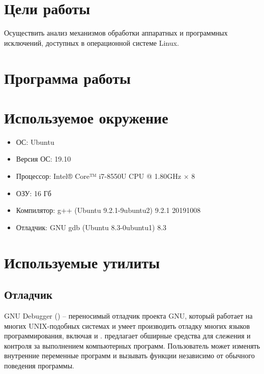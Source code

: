





\tableofcontents
\newpage

\section{Цели работы}

Осуществить анализ механизмов обработки аппаратных и программных исключений, доступных в операционной системе Linux.

\section{Программа работы}



\section{Используемое окружение}

\begin{itemize}
	\item ОС: Ubuntu
	\item Версия ОС: 19.10
	\item Процессор: Intel® Core™ i7-8550U CPU @ 1.80GHz × 8
	\item ОЗУ: 16 Гб
	\item Компилятор: g++ (Ubuntu 9.2.1-9ubuntu2) 9.2.1 20191008
	\item Отладчик: GNU gdb (Ubuntu 8.3-0ubuntu1) 8.3
\end{itemize}

\section{Используемые утилиты}

\subsection{Отладчик }

GNU Debugger () -- переносимый отладчик проекта GNU, который работает на многих UNIX-подобных системах и умеет производить отладку многих языков программирования, включая  и .  предлагает обширные средства для слежения и контроля за выполнением компьютерных программ. Пользователь может изменять внутренние переменные программ и вызывать функции независимо от обычного поведения программы.

